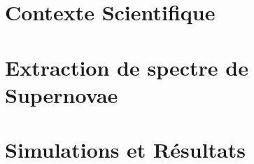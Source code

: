 \documentclass[a4paper, 12pt, final, garamond]{book}
\begin{document}
    
    
    
    
    \cleardoublepage
    \dominitoc
    \tableofcontents
    \listoffigures
    \listoftables
     
    \part{Contexte Scientifique}
    
    
    
    \part{Extraction de spectre de Supernovae}
    
    
    
    
    \part{Simulations et Résultats}
    
    
    
    
    
\end{document}
